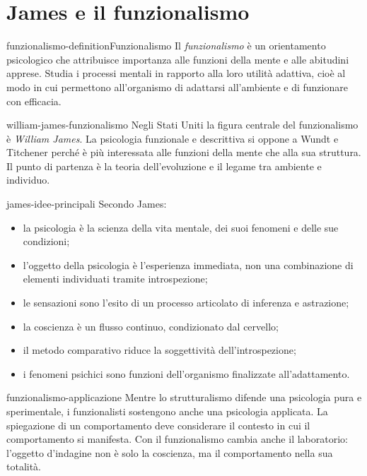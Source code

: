 \documentclass[preview]{standalone}
\begin{document}
\genpage

\section{James e il funzionalismo}

\begin{snippetdefinition}{funzionalismo-definition}{Funzionalismo}
    Il \emph{funzionalismo} è un orientamento psicologico che attribuisce
    importanza alle funzioni della mente e alle abitudini apprese. Studia i
    processi mentali in rapporto alla loro utilità adattiva, cioè al modo in
    cui permettono all'organismo di adattarsi all'ambiente e di funzionare con
    efficacia.
\end{snippetdefinition}

\begin{snippet}{william-james-funzionalismo}
    Negli Stati Uniti la figura centrale del funzionalismo è
    \emph{William James}. La psicologia funzionale e descrittiva si oppone a
    Wundt e Titchener perché è più interessata alle funzioni della mente che
    alla sua struttura. Il punto di partenza è la teoria dell'evoluzione e il
    legame tra ambiente e individuo.
\end{snippet}

\begin{snippet}{james-idee-principali}
    Secondo James:
    \begin{itemize}
        \item la psicologia è la scienza della vita mentale, dei suoi fenomeni
        e delle sue condizioni;
        \item l'oggetto della psicologia è l'esperienza immediata, non una
        combinazione di elementi individuati tramite introspezione;
        \item le sensazioni sono l'esito di un processo articolato di inferenza
        e astrazione;
        \item la coscienza è un flusso continuo, condizionato dal cervello;
        \item il metodo comparativo riduce la soggettività dell'introspezione;
        \item i fenomeni psichici sono funzioni dell'organismo finalizzate
        all'adattamento.
    \end{itemize}
\end{snippet}

\begin{snippet}{funzionalismo-applicazione}
    Mentre lo strutturalismo difende una psicologia pura e sperimentale, i
    funzionalisti sostengono anche una psicologia applicata. La spiegazione di
    un comportamento deve considerare il contesto in cui il comportamento si
    manifesta. Con il funzionalismo cambia anche il laboratorio: l'oggetto
    d'indagine non è solo la coscienza, ma il comportamento nella sua totalità.
\end{snippet}
\end{document}
